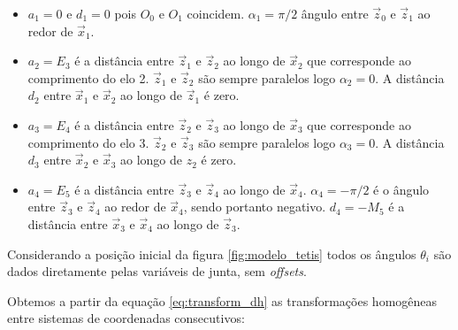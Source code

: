 \begin{itemize}
\item $a_1 = 0$  e $d_1 = 0$ pois $O_0$ e $O_1$ coincidem. $\alpha_1 = \pi/2$ ângulo entre $\vec{z}_0$ e $\vec{z}_1$ ao redor de $\vec{x}_1$.
\item $a_2 = E_3$ é a distância entre $\vec{z}_1$ e $\vec{z}_2$ ao longo de $\vec{x}_2$ que corresponde ao comprimento do elo 2. $\vec{z}_1$ e $\vec{z}_2$ são sempre paralelos logo $\alpha_2 = 0$. A distância $d_2$ entre $\vec{x}_1$ e $\vec{x}_2$ ao longo de $\vec{z}_1$ é zero. 

\item $a_3 = E_4$ é a distância entre $\vec{z}_2$ e $\vec{z}_3$ ao longo de $\vec{x}_3$ que corresponde ao comprimento do elo 3. $\vec{z}_2$ e $\vec{z}_3$ são sempre paralelos logo $\alpha_3 = 0$. A distância $d_3$ entre $\vec{x}_2$ e $\vec{x}_3$ ao longo de $z_2$ é zero. 

\item $a_4 = E_5$ é a distância entre $\vec{z}_3$ e $\vec{z}_4$ ao longo de $\vec{x}_4$. $\alpha_4 = -\pi/2$ é o ângulo entre $\vec{z}_3$ e $\vec{z}_4$ ao redor de $\vec{x}_4$, sendo portanto negativo. $d_4 = -M_5$ é a distância entre $\vec{x}_3$ e $\vec{x}_4$ ao longo de $\vec{z}_3$. 
\end{itemize}

Considerando a posição inicial da figura \ref{fig:modelo_tetis} todos os ângulos $\theta_i$ são dados diretamente pelas variáveis de junta, sem \textit{offsets}. 


Obtemos a partir da equação \eqref{eq:transform_dh} as transformações homogêneas entre sistemas de coordenadas consecutivos:


